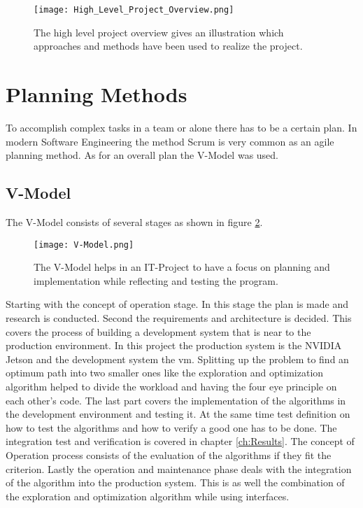 \begin{figure}[H]
    \centering
    \texttt{[image: High\_Level\_Project\_Overview.png]}
    \caption{The high level project overview gives an illustration which approaches and methods have been used to realize the project.}
    \label{fig:High Level Project Overview}
\end{figure}

\section{Planning Methods} \label{sec:Planning Methods}
To accomplish complex tasks in a team or alone there has to be a certain plan. In modern Software Engineering the method Scrum is very common as an agile planning method. As for an overall plan the V-Model was used.

\subsection{V-Model} \label{sec:Planning Method: V-Model}
The V-Model consists of several stages as shown in figure \ref{fig:V-Model}.
\begin{figure}[H]
    \centering
    \texttt{[image: V-Model.png]}
    \caption{The V-Model helps in an IT-Project to have a focus on planning and implementation while reflecting and testing the program.}
    \label{fig:V-Model}
\end{figure}

Starting with the concept of operation stage. In this stage the plan is made and research is conducted. Second the requirements and architecture is decided. This covers the process of building a development system that is near to the production environment. In this project the production system is the NVIDIA Jetson and the development system the \acrlong{vm}. Splitting up the problem to find an optimum path into two smaller ones like the exploration and optimization algorithm helped to divide the workload and having the four eye principle on each other's code. The last part covers the implementation of the algorithms in the development environment and testing it. At the same time test definition on how to test the algorithms and how to verify a good one has to be done. The integration test and verification is covered in chapter \ref{ch:Results}. The concept of Operation process consists of the evaluation of the algorithms if they fit the criterion. Lastly the operation and maintenance phase deals with the integration of the algorithm into the production system. This is as well the combination of the exploration and optimization algorithm while using interfaces.

